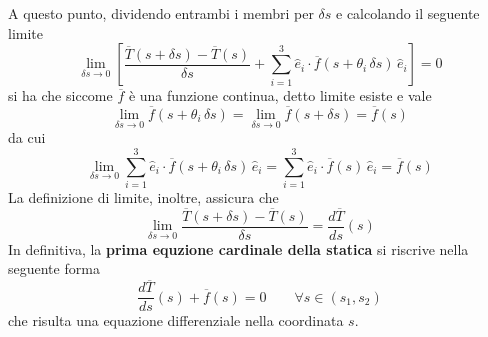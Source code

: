 A questo punto, dividendo entrambi i membri per $\delta s$ e calcolando il seguente limite
\[
\lim_{\delta s\to 0} \left[ \dfrac{\overline{T}(s+\delta s)-\overline{T}(s)}{\delta s} + \sum_{i=1}^3 \hat{e}_i\cdot \overline{f}(s+\theta_i\,\delta s)\,\hat{e}_i \right] = 0
\]
si ha che siccome $\overline{f}$ è una funzione continua, detto limite esiste e vale
\[
\lim_{\delta s \to 0} \overline{f}(s+\theta_i\,\delta s) = \lim_{\delta s \to 0} \overline{f}(s+\delta s) = \overline{f}(s)
\]
da cui
\[
\lim_{\delta s \to 0} \sum_{i=1}^3 \hat{e}_i\cdot \overline{f}(s+\theta_i\,\delta s)\,\hat{e}_i = \sum_{i=1}^3 \hat{e}_i\cdot \overline{f}(s)\,\hat{e}_i = \overline{f}(s)
\]
La definizione di limite, inoltre, assicura che
\[
\lim_{\delta s \to 0} \dfrac{\overline{T}(s+\delta s)-\overline{T}(s)}{\delta s} = \dfrac{d\overline{T}}{ds}(s)
\]
In definitiva, la \textbf{prima equzione cardinale della statica} si riscrive nella seguente forma
\begin{equation}
\label{eq:prima_eq_cardinale_statica}
\dfrac{d\overline{T}}{ds}(s) + \overline{f}(s) = 0\qquad \forall s \in (s_1, s_2)
\end{equation}
che risulta una equazione differenziale nella coordinata $s$.

